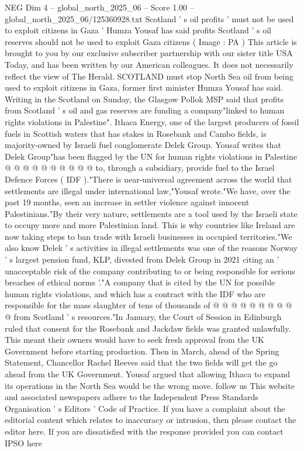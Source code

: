 \begin{textsample}{NEG Dim 4 – global\_north\_2025\_06 – Score 1.00 – global\_north\_2025\_06/125360928.txt}  \label{ex:f4_neg_067}
Scotland ' s oil profits ' must not be used to exploit citizens in Gaza ' Humza Yousaf has said profits Scotland ' s oil reserves should not be used to exploit Gaza citizens ( Image : PA ) This article is brought to you by our exclusive subscriber partnership with our sister title USA Today, and has been written by our American colleagues.
It does not necessarily reflect the view of The Herald.
SCOTLAND must stop North Sea oil from being used to exploit citizens in Gaza, former first minister Humza Yousaf has said.
Writing in the Scotland on Sunday, the Glasgow Pollok MSP said that profits from Scotland ' s oil and gas reserves are funding a company"linked to human rights violations in Palestine".
Ithaca Energy, one of the largest producers of fossil fuels in Scottish waters that has stakes in Rosebank and Cambo fields, is majority-owned by Israeli fuel conglomerate Delek Group.
Yousaf writes that Delek Group"has been flagged by the UN for human rights violations in Palestine @ @ @ @ @ @ @ @ @ @ to, through a subsidiary, provide fuel to the Israel Defence Forces ( IDF )."There is near-universal agreement across the world that settlements are illegal under international law,"Yousaf wrote."We have, over the past 19 months, seen an increase in settler violence against innocent Palestinians."By their very nature, settlements are a tool used by the Israeli state to occupy more and more Palestinian land.
This is why countries like Ireland are now taking steps to ban trade with Israeli businesses in occupied territories."We also know Delek ' s activities in illegal settlements was one of the reasons Norway ' s largest pension fund, KLP, divested from Delek Group in 2021 citing an ' unacceptable risk of the company contributing to or being responsible for serious breaches of ethical norms '."A company that is cited by the UN for possible human rights violations, and which has a contract with the IDF who are responsible for the mass slaughter of tens of thousands of @ @ @ @ @ @ @ @ @ @ from Scotland ' s resources."In January, the Court of Session in Edinburgh ruled that consent for the Rosebank and Jackdaw fields was granted unlawfully.
This meant their owners would have to seek fresh approval from the UK Government before starting production.
Then in March, ahead of the Spring Statement, Chancellor Rachel Reeves said that the two fields will get the go ahead from the UK Government.
Yousaf argued that allowing Ithaca to expand its operations in the North Sea would be the wrong move. follow us This website and associated newspapers adhere to the Independent Press Standards Organisation ' s Editors ' Code of Practice.
If you have a complaint about the editorial content which relates to inaccuracy or intrusion, then please contact the editor here.
If you are dissatisfied with the response provided you can contact IPSO here

\end{textsample}
